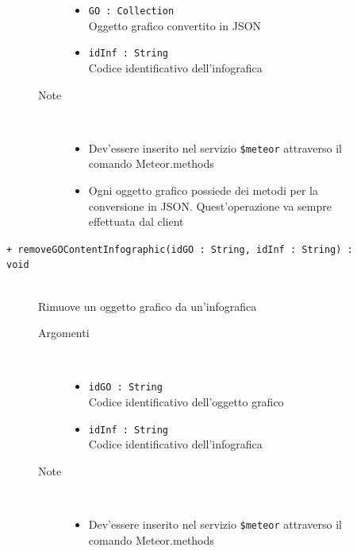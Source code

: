 \begin{description}
\begin{description}
\begin{description}
\begin{itemize}
					\item \texttt{GO : Collection			} \hfill \\
					Oggetto grafico convertito in JSON
					\item \texttt{idInf :  String			} \hfill \\
					Codice identificativo dell'infografica
					
				\end{itemize}
			\item[Note] \hfill \\
			\begin{itemize}
					\item Dev'essere inserito nel servizio \texttt{\$meteor} attraverso il comando Meteor.methods
					\item Ogni oggetto grafico possiede dei metodi per la conversione in JSON. Quest'operazione va sempre effettuata dal client
				\end{itemize}
		\end{description}
	\end{description}
	
	\begin{description}
		\item[\texttt{+ removeGOContentInfographic(idGO : String, idInf : String) : void			}] \hfill \\
			Rimuove un oggetto grafico da un'infografica
			
		\begin{description}
			\item[Argomenti] \hfill \\
				\begin{itemize}
				
					\item \texttt{idGO : String			} \hfill \\
					Codice identificativo dell'oggetto grafico
					\item \texttt{idInf : String			} \hfill \\
					Codice identificativo dell'infografica
					
				\end{itemize}
			\item[Note] \hfill \\
			\begin{itemize}
					\item Dev'essere inserito nel servizio \texttt{\$meteor} attraverso il comando Meteor.methods
				\end{itemize}
		\end{description}
	\end{description}
	

\end{description}
